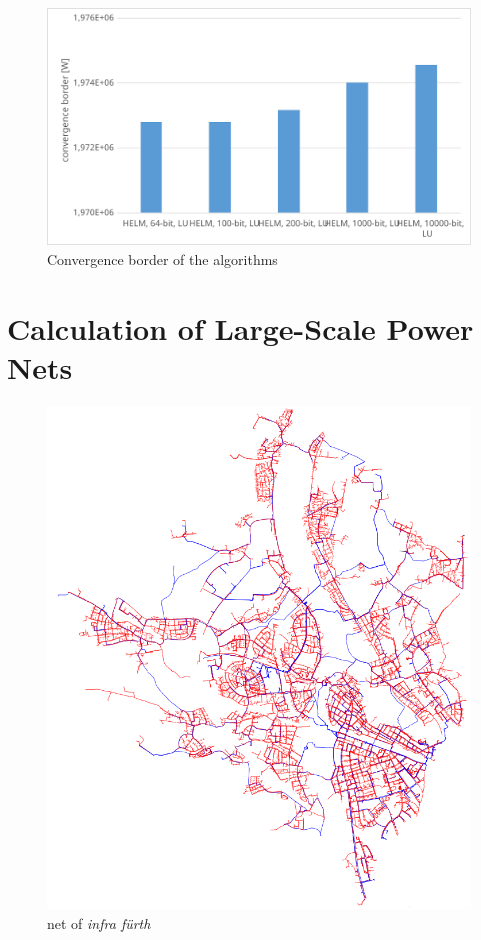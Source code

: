 \begin{figure}
	\centering
	\includegraphics[scale=0.7]{figures/convergence_border_vorstadtnetz_3}
	\caption[Comparison, convergence]{Convergence border of the algorithms}
	\label{fig:comparison_convergence_border_3}
\end{figure}

\section{Calculation of Large-Scale Power Nets}
\label{sec:large_scale_power nets}

\begin{figure}
	\centering
	\includegraphics[width=\textwidth]{figures/infra_fuerth_netz}
	\caption[net of \emph{infra fürth}]{net of \emph{infra fürth}}
	\label{fig:infra_fuerth_net}
\end{figure}
	
